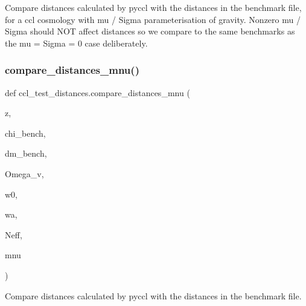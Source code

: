 \begin{DoxyVerb}Compare distances calculated by pyccl with the distances in the benchmark 
file, for a ccl cosmology with mu / Sigma parameterisation of gravity.
Nonzero mu / Sigma should NOT affect distances so we compare to the same
benchmarks as the mu = Sigma = 0 case deliberately.
\end{DoxyVerb}
 \mbox{\label{namespaceccl__test__distances_a0cce8b8b66ddb4e327b1905ca907bb59}} 
\subsubsection{\texorpdfstring{compare\+\_\+distances\+\_\+mnu()}{compare\_distances\_mnu()}}
{\footnotesize\ttfamily def ccl\+\_\+test\+\_\+distances.\+compare\+\_\+distances\+\_\+mnu (\begin{DoxyParamCaption}\item[{}]{z,  }\item[{}]{chi\+\_\+bench,  }\item[{}]{dm\+\_\+bench,  }\item[{}]{Omega\+\_\+v,  }\item[{}]{w0,  }\item[{}]{wa,  }\item[{}]{Neff,  }\item[{}]{mnu }\end{DoxyParamCaption})}

\begin{DoxyVerb}Compare distances calculated by pyccl with the distances in the benchmark
file.
\end{DoxyVerb}
 \mbox{\label{namespaceccl__test__distances_a31ef9701c1a38e122ac4d470345c8758}} 
